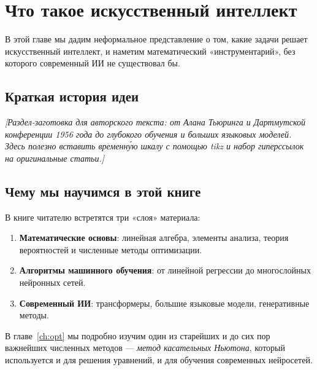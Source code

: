 \chapter{Что такое искусственный интеллект}
\label{ch:intro}

В этой главе мы дадим неформальное представление о том, какие задачи
решает искусственный интеллект, и наметим математический «инструментарий»,
без которого современный ИИ не существовал бы.

\section{Краткая история идеи}

\textit{[Раздел-заготовка для авторского текста: от Алана Тьюринга и
Дартмутской конференции 1956 года до глубокого обучения и больших
языковых моделей. Здесь полезно вставить временну́ю шкалу с помощью
\textit{tikz} и набор гиперссылок на оригинальные статьи.]}

\section{Чему мы научимся в этой книге}

В книге читателю встретятся три «слоя» материала:
\begin{enumerate}
  \item \textbf{Математические основы}: линейная алгебра, элементы
        анализа, теория вероятностей и численные методы оптимизации.
  \item \textbf{Алгоритмы машинного обучения}: от линейной регрессии
        до многослойных нейронных сетей.
  \item \textbf{Современный ИИ}: трансформеры, большие языковые модели,
        генеративные методы.
\end{enumerate}

В главе~\ref{ch:opt} мы подробно изучим один из старейших и до сих пор
важнейших численных методов — \emph{метод касательных Ньютона}, который
используется и для решения уравнений, и для обучения современных
нейросетей.
